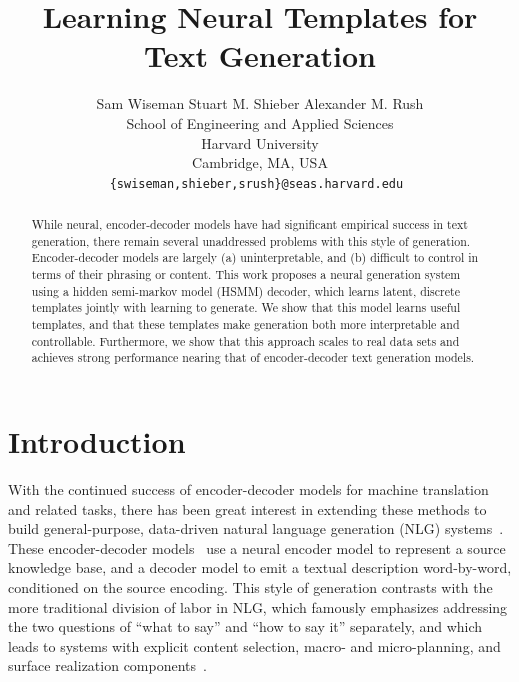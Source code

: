 \documentclass[11pt,a4paper]{article}
\title{Learning Neural Templates for Text Generation}
\author{Sam Wiseman \quad \quad \quad  Stuart M. Shieber  \quad \quad \quad Alexander M. Rush \\
         School of Engineering and Applied Sciences \\ Harvard University \\ Cambridge, MA, USA \\ {\tt \{swiseman,shieber,srush\}@seas.harvard.edu }}
\date{}
\begin{document}
\maketitle
\begin{abstract}
 While neural, encoder-decoder models have had significant empirical success in text generation, there remain several unaddressed problems with this style of generation. Encoder-decoder models are largely (a) uninterpretable, and (b) difficult to control in terms of their phrasing or content. This work proposes a neural generation system using a hidden semi-markov model (HSMM) decoder, which learns latent, discrete templates jointly with learning to generate. We show that this model learns useful templates, and that these templates make generation both more interpretable and controllable. Furthermore, we show that this approach scales to real data sets and achieves strong performance nearing that of encoder-decoder text generation models.
\end{abstract}

\section{Introduction}


With the continued success of encoder-decoder models for machine translation and related tasks, there has been great interest in extending these methods to build general-purpose, data-driven natural language generation (NLG) systems~\citep{mei2016what,duvsek2016sequence,lebret2016neural,chisholm2017learning,wiseman2017challenges}. These encoder-decoder models~\citep{sutskever2014sequence,cho2014on,bahdanau2015neural} use a neural encoder model to represent a source knowledge base, and a decoder model to emit a textual description word-by-word, conditioned on the source encoding. This style of generation contrasts with the more traditional division of labor in NLG, which famously emphasizes addressing the two questions of ``what to say'' and ``how to say it'' separately, and which leads to systems with explicit content selection, macro- and micro-planning, and surface realization components~\citep{reiter1997building,jurafsky2014speech}. 
\end{document}
